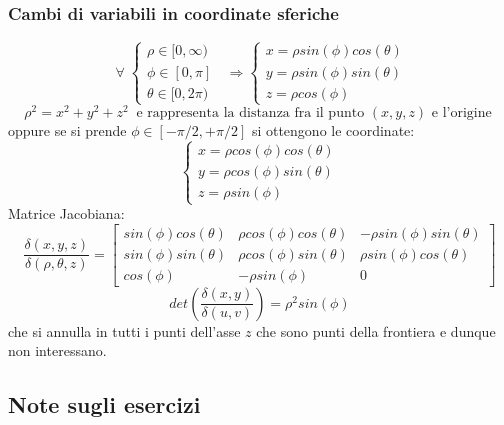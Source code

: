 \subsubsection{Cambi di variabili in coordinate sferiche}
\[
    \;\forall\; \begin{cases}
        \rho \in [0,\infty)\\
        \phi \in [0,\pi]\\
        \theta \in [0,2\pi)
    \end{cases} \;\; \Longrightarrow \begin{cases}
        x = \rho sin(\phi) cos(\theta)\\
        y = \rho sin(\phi) sin(\theta)\\
        z = \rho cos(\phi)
    \end{cases}
\]
\[
    \rho^2 = x^2 +y^2+z^2 \;\; \text{e rappresenta la distanza fra il punto $(x,y,z)$ e l'origine}\;
\]
oppure se si prende $\phi \in [-\pi /2, + \pi/2]$ si ottengono le coordinate:
\[
    \begin{cases}
        x = \rho cos(\phi) cos(\theta)\\
        y = \rho cos(\phi) sin(\theta)\\
        z = \rho sin(\phi)
    \end{cases}
\]
Matrice Jacobiana:
\[
    \frac{\delta(x,y,z)}{\delta(\rho,\theta,z)} = \left[
        \begin{matrix}
            sin(\phi) cos(\theta) & \rho cos(\phi) cos(\theta) & -\rho sin(\phi) sin(\theta)\\ 
            sin(\phi) sin(\theta) & \rho cos(\phi) sin(\theta) & \rho sin(\phi) cos(\theta) \\ 
            cos(\phi) & -\rho sin(\phi) & 0
        \end{matrix}\right]
\]
\[
    det\left(\frac{\delta(x,y)}{\delta(u,v)}\right) = \rho^2 sin(\phi)
\]
che si annulla in tutti i punti dell'asse $z$ che sono punti della frontiera e dunque non interessano.
\subsection{Note sugli esercizi}
